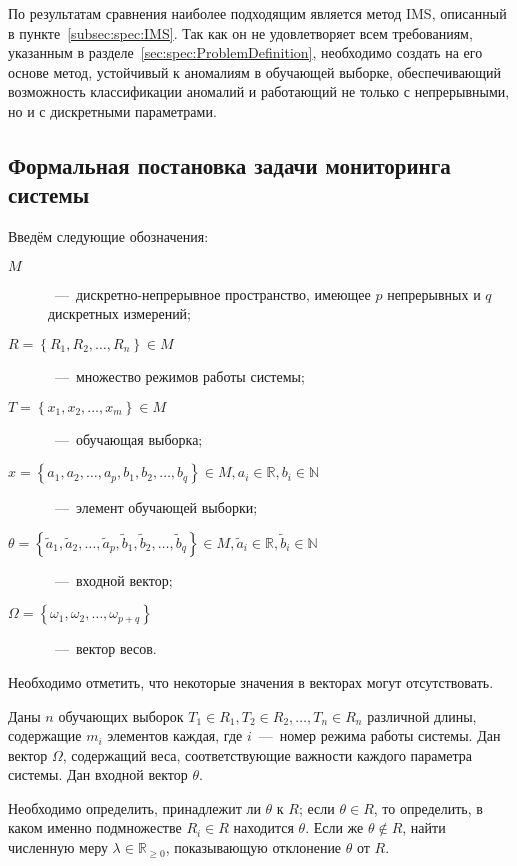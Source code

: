 По результатам сравнения наиболее подходящим является метод IMS, описанный в пункте~\ref{subsec:spec:IMS}. Так как он не удовлетворяет всем требованиям, указанным в разделе~\ref{sec:spec:ProblemDefinition}, необходимо создать на его основе метод, устойчивый к аномалиям в обучающей выборке, обеспечивающий возможность классификации аномалий и работающий не только с непрерывными, но и с дискретными параметрами.

\subsection{Формальная постановка задачи мониторинга системы}
Введём следующие обозначения:
\begin{description}
	\item[$M$]~---~дискретно-непрерывное пространство, имеющее $p$ непрерывных и $q$ дискретных измерений;
	\item[$R=\left\{R_1,R_2,\dots,R_n\right\} \in M$]~---~множество режимов работы системы;
	\item[$T=\left\{x_1,x_2,\dots,x_m\right\} \in M$]~---~обучающая выборка;
	\item[$x=\left\{a_1,a_2,\dots,a_p,b_1,b_2,\dots,b_q\right\} \in M, a_i\in\mathbb{R}, b_i\in\mathbb{N}$]~---~элемент обучающей выборки;
	\item[$\theta=\left\{\tilde{a}_1,\tilde{a}_2,\dots,\tilde{a}_p,\tilde{b}_1,\tilde{b}_2,\dots,\tilde{b}_q\right\} \in M, \tilde{a}_i\in\mathbb{R}, \tilde{b}_i\in\mathbb{N}$]~---~входной вектор;
	\item[$\Omega=\left\{\omega_1,\omega_2,\dots,\omega_{p+q}\right\}$]~---~вектор весов.
\end{description}

Необходимо отметить, что некоторые значения в векторах могут отсутствовать.

Даны $n$ обучающих выборок $T_1\in R_1, T_2\in R_2,\dots, T_n\in R_n$ различной длины, содержащие $m_i$ элементов каждая, где $i$~---~номер режима работы системы. Дан вектор $\Omega$, содержащий веса, соответствующие важности каждого параметра системы. Дан входной вектор $\theta$.

Необходимо определить, принадлежит ли $\theta$ к $R$; если $\theta \in R$, то определить, в каком именно подмножестве $R_i\in R$ находится $\theta$. Если же $\theta \notin R$, найти численную меру $\lambda \in \mathbb{R}_{\geq 0}$, показывающую отклонение $\theta$ от $R$.

